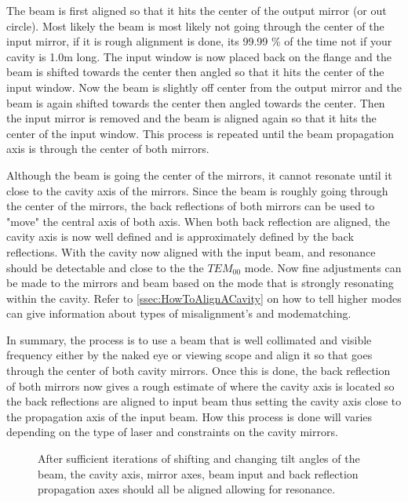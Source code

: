 \documentclass[11pt,a4paper]{book}
\newcommand{\imginput}[1]{} %
\begin{document}
		The beam is first aligned so that it hits the center of the output mirror (or out circle). Most likely the beam is most likely not going through the center of the input mirror, if it is rough alignment is done, its 99.99 \% of the time not if your cavity is 1.0m long. The input window is now placed back on the flange and the beam is shifted towards the center then angled so that it hits the center of the input window. Now the beam is slightly off center from the output mirror and the beam is again shifted towards the center then angled towards the center. Then the input mirror is removed and the beam is aligned again so that it hits the center of the input window. This process is repeated until the beam propagation axis is through the center of both mirrors. 
		
		Although the beam is going the center of the mirrors, it cannot resonate until it close to the cavity axis of the mirrors. Since the beam is roughly going through the center of the mirrors, the back reflections of both mirrors can be used to "move" the central axis of both axis. When both back reflection are aligned, the cavity axis is now well defined and is approximately defined by the back reflections. With the cavity now aligned with the input beam, and resonance should be detectable and close to the the $TEM_{00}$ mode. Now fine adjustments can be made to the mirrors and beam based on the mode that is strongly resonating within the cavity. Refer to \autoref{ssec:HowToAlignACavity} on how to tell higher modes can give information about types of misalignment's and modematching.
		
		In summary, the process is to use a beam that is well collimated and visible frequency either by the naked eye or viewing scope and align it so that goes through the center of both cavity mirrors. Once this is done, the back reflection of both mirrors now gives a rough estimate of where the cavity axis is located so the back reflections are aligned to input beam thus setting the cavity axis close to the propagation axis of the input beam. How this process is done will varies depending on the type of laser and constraints on the cavity mirrors.
		
		\begin{figure} [!ht]
			\centering
			\def\svgwidth{\columnwidth}
			\resizebox{130mm}{!}{\imginput{images/cav-align-proper.pdf_tex}}
			\caption{After sufficient iterations of shifting and changing tilt angles of the beam, the cavity axis, mirror axes, beam input and back reflection propagation axes should all be aligned allowing for resonance. }
			\label{fig:cav-align-proper}
		\end{figure}
\end{document}
